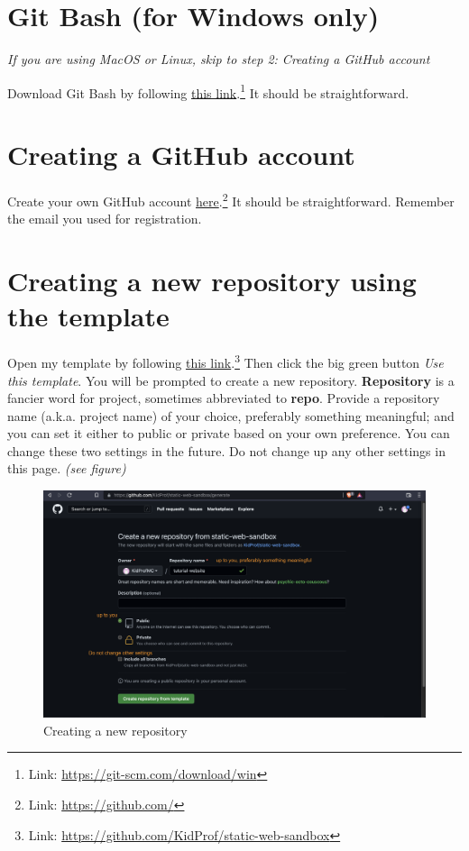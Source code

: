 \section{Git Bash (for Windows only)}
\label{sec:install1}

\textit{If you are using MacOS or Linux, skip to step 2: Creating a GitHub account}
\vspace{6mm}

Download Git Bash by following \href{https://git-scm.com/download/win}{this link}.\footnote{Link: \url{https://git-scm.com/download/win}} It should be straightforward.

\section{Creating a GitHub account}

Create your own GitHub account \href{https://github.com/}{here}.\footnote{Link: \url{https://github.com/}} It should be straightforward. Remember the email you used for registration.

\section{Creating a new repository using the template}

Open my template by following \href{https://github.com/KidProf/static-web-sandbox}{this link}.\footnote{Link: \url{https://github.com/KidProf/static-web-sandbox}} Then click the big green button \textit{Use this template}. You will be prompted to create a new repository. \textbf{Repository} is a fancier word for project, sometimes abbreviated to \textbf{repo}. Provide a repository name (a.k.a. project name) of your choice, preferably something meaningful; and you can set it either to public or private based on your own preference. You can change these two settings in the future. Do not change up any other settings in this page. \textit{(see figure)}

\begin{figure}[h]
\centering
\includegraphics[width=15cm]{images/ch1-create-new-repo.png}
\caption{Creating a new repository}
\end{figure}

